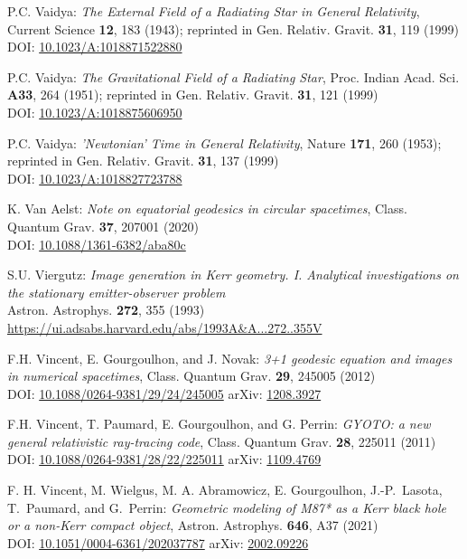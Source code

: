 \begin{thebibliography}{123}
P.C. Vaidya:
{\em The External Field of a Radiating Star in General Relativity},
Current Science {\bf 12}, 183 (1943);
reprinted in Gen. Relativ. Gravit. {\bf 31}, 119 (1999)\\
DOI: \href{https://doi.org/10.1023/A:1018871522880}{10.1023/A:1018871522880}

P.C. Vaidya:
{\em The Gravitational Field of a Radiating Star},
Proc. Indian Acad. Sci. {\bf A33}, 264 (1951);
reprinted in Gen. Relativ. Gravit. {\bf 31}, 121 (1999)\\
DOI: \href{https://doi.org/10.1023/A:1018875606950}{10.1023/A:1018875606950}

P.C. Vaidya:
{\em 'Newtonian' Time in General Relativity},
Nature {\bf 171}, 260 (1953);
reprinted in Gen. Relativ. Gravit. {\bf 31}, 137 (1999)\\
DOI: \href{https://doi.org/10.1023/A:1018827723788}{10.1023/A:1018827723788}

K. Van Aelst: {\em Note on equatorial geodesics in circular spacetimes},
Class. Quantum Grav. {\bf 37}, 207001 (2020)\\
DOI: \href{https://doi.org/10.1088/1361-6382/aba80c}{10.1088/1361-6382/aba80c}

S.U. Viergutz:
{\em Image generation in Kerr geometry. I. Analytical investigations on the stationary emitter-observer problem}\\
Astron. Astrophys. {\bf 272}, 355 (1993)\\
\url{https://ui.adsabs.harvard.edu/abs/1993A&A...272..355V}

F.H. Vincent, E. Gourgoulhon, and J. Novak:
{\em 3+1 geodesic equation and images in numerical spacetimes},
Class. Quantum Grav. {\bf 29}, 245005 (2012)\\
DOI: \href{https://doi.org/10.1088/0264-9381/29/24/245005}{10.1088/0264-9381/29/24/245005}\hfill
arXiv: \href{https://arxiv.org/abs/1208.3927}{1208.3927}

F.H. Vincent, T. Paumard, E. Gourgoulhon, and G. Perrin:
{\em GYOTO: a new general relativistic ray-tracing code},
Class. Quantum Grav. {\bf 28}, 225011 (2011)\\
DOI: \href{https://doi.org/10.1088/0264-9381/28/22/225011}{10.1088/0264-9381/28/22/225011}
\hfill
arXiv: \href{https://arxiv.org/abs/1109.4769}{1109.4769}

F. H. Vincent, M. Wielgus, M. A. Abramowicz, E. Gourgoulhon, J.-P.~Lasota, T.~Paumard,
and G.~Perrin:
{\em Geometric modeling of M87* as a Kerr black hole or a non-Kerr compact object},
Astron. Astrophys. {\bf 646}, A37 (2021)\\
DOI: \href{https://doi.org/10.1051/0004-6361/202037787}{10.1051/0004-6361/202037787}\hfill
arXiv: \href{https://arxiv.org/abs/2002.09226}{2002.09226}


\end{thebibliography}
